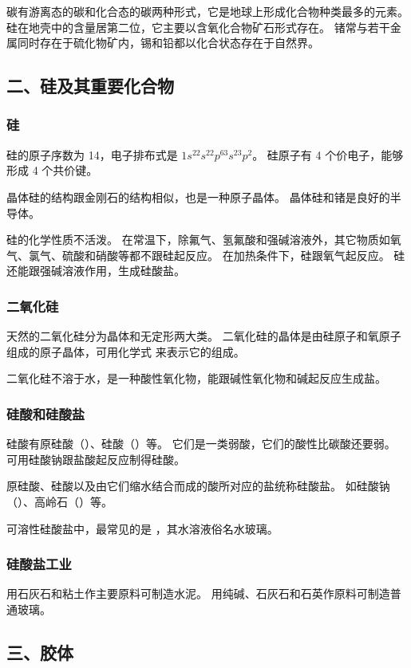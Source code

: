 碳有游离态的碳和化合态的碳两种形式，它是地球上形成化合物种类最多的元素。
硅在地壳中的含量居第二位，它主要以含氧化合物矿石形式存在。
锗常与若干金属同时存在于硫化物矿内，锡和铅都以化合状态存在于自然界。

\subsection*{二、硅及其重要化合物}\setcounter{subsubsection}{0}
\subsubsection{硅}
硅的原子序数为 14，电子排布式是 $1s^22s^22p^63s^23p^2$。
硅原子有 4 个价电子，能够形成 4 个共价键。

晶体硅的结构跟金刚石的结构相似，也是一种原子晶体。
晶体硅和锗是良好的半导体。

硅的化学性质不活泼。
在常温下，除氟气、氢氟酸和强碱溶液外，其它物质如氧气、氯气、硫酸和硝酸等都不跟硅起反应。
在加热条件下，硅跟氧气起反应。
硅还能跟强碱溶液作用，生成硅酸盐。

\subsubsection{二氧化硅}
天然的二氧化硅分为晶体和无定形两大类。
二氧化硅的晶体是由硅原子和氧原子组成的原子晶体，可用化学式  来表示它的组成。

二氧化硅不溶于水，是一种酸性氧化物，能跟碱性氧化物和碱起反应生成盐。

\subsubsection{硅酸和硅酸盐}
硅酸有原硅酸（）、硅酸（）等。
它们是一类弱酸，它们的酸性比碳酸还要弱。
可用硅酸钠跟盐酸起反应制得硅酸。

原硅酸、硅酸以及由它们缩水结合而成的酸所对应的盐统称硅酸盐。
如硅酸钠（）、高岭石（）等。

可溶性硅酸盐中，最常见的是 ，其水溶液俗名水玻璃。

\subsubsection{硅酸盐工业}
用石灰石和粘土作主要原料可制造水泥。
用纯碱、石灰石和石英作原料可制造普通玻璃。

\subsection*{三、胶体}\setcounter{subsubsection}{0}
